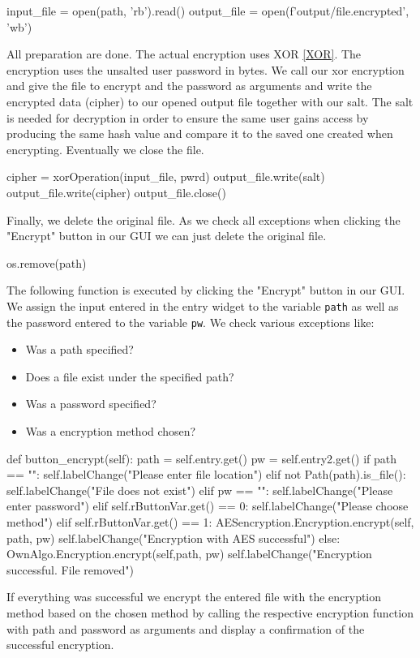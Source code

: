 \documentclass[]{article}
\begin{document}
\begin{python}
input_file = open(path, 'rb').read()
output_file = open(f'output/{file}.encrypted', 'wb')
\end{python}
\noindent
All preparation are done. The actual encryption uses XOR \ref{XOR}.
The encryption uses the unsalted user password in bytes. We call our xor encryption and give the file to encrypt 
and the password as arguments and write the encrypted data (cipher) to our opened output 
file together with our salt. The salt is needed for decryption in order to ensure the same user gains access by
producing the same hash value and compare it to the saved one created when encrypting. Eventually we close the file.

\begin{python}
cipher = xorOperation(input_file, pwrd)
output_file.write(salt)
output_file.write(cipher)
output_file.close()
\end{python}
\noindent
Finally, we delete the original file. As we check all exceptions when clicking the "Encrypt" button in our
GUI we can just delete the original file.

\begin{python}
os.remove(path)
\end{python}
\noindent
The following function is executed by clicking the "Encrypt" button in our GUI. We assign the input entered in
the entry widget to the variable \texttt{path} as well as the password entered to the variable \texttt{pw}. 
We check various exceptions like:
\begin{itemize} \label{excep}
    \item Was a path specified?
    \item Does a file exist under the specified path?
    \item Was a password specified?
    \item Was a encryption method chosen?
\end{itemize}

\begin{python}
def button_encrypt(self):
    path = self.entry.get()
    pw = self.entry2.get()
    if path == "":
        self.labelChange("Please enter file location")
    elif not Path(path).is_file():
        self.labelChange("File does not exist")
    elif pw == "":
        self.labelChange("Please enter password")
    elif self.rButtonVar.get() == 0:
        self.labelChange("Please choose method")
    elif self.rButtonVar.get() == 1:
        AESencryption.Encryption.encrypt(self, path, pw)
        self.labelChange("Encryption with AES successful")
    else:
        OwnAlgo.Encryption.encrypt(self,path, pw)
        self.labelChange("Encryption successful. File removed")
\end{python}
\noindent
If everything was successful we encrypt the entered file with the encryption method based on the chosen 
method by calling the respective encryption function with path and password as arguments and display a 
confirmation of the successful encryption.
\end{document}
